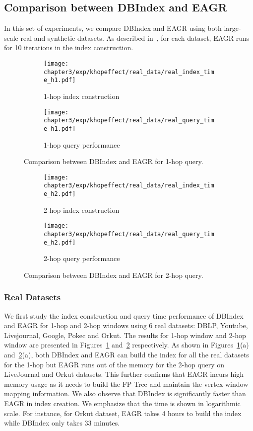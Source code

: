 \subsection{Comparison between DBIndex and EAGR}

In this set of experiments, we compare DBIndex and 
EAGR \cite{mondal2014eagr} using both large-scale real 
and synthetic datasets. As described in~\cite{mondal2014eagr},
for each dataset, EAGR runs for 10 
iterations in the index construction.

\begin{figure}[h]
\centering
\begin{subfigure}{0.45\linewidth}
  \centering
  \texttt{[image: chapter3/exp/khopeffect/real\_data/real\_index\_time\_h1.pdf]}
  \caption{1-hop index construction}
\end{subfigure} \begin{subfigure}{0.45\linewidth}
  \centering
  \texttt{[image: chapter3/exp/khopeffect/real\_data/real\_query\_time\_h1.pdf]}
  \caption{1-hop query performance}
\end{subfigure}%
\caption{Comparison between DBIndex and EAGR  for 1-hop query.}
\label{fig:1-hop-real}
\end{figure}

\begin{figure}[h]
\centering
\begin{subfigure}{0.45\linewidth}
  \centering
  \texttt{[image: chapter3/exp/khopeffect/real\_data/real\_index\_time\_h2.pdf]}
  \caption{2-hop index construction}
\end{subfigure}
\begin{subfigure}{0.45\linewidth}
  \centering
  \texttt{[image: chapter3/exp/khopeffect/real\_data/real\_query\_time\_h2.pdf]}
  \caption{2-hop query performance}
\end{subfigure}
\caption{Comparison between DBIndex and EAGR for 2-hop query.}
\label{fig:2-hop-real}
\end{figure}

\subsubsection{Real Datasets} 
We first study the index construction and 
query time performance of DBIndex and EAGR for 1-hop and 2-hop windows 
using 6 real datasets: DBLP, Youtube, Livejournal, Google, Pokec and Orkut. 
The results for 1-hop window and 2-hop window are presented
in Figures~\ref{fig:1-hop-real} and~\ref{fig:2-hop-real} 
respectively. 
As shown in Figures~\ref{fig:1-hop-real}(a) and~\ref{fig:2-hop-real}(a), both DBIndex and EAGR can build the index for all
the real datasets for the 1-hop but EAGR runs out of the memory for the 2-hop query on LiveJournal and Orkut datasets. This further confirms that EAGR incurs 
high memory usage as it needs to build the FP-Tree and 
maintain the vertex-window mapping information. We also observe that 
DBIndex is significantly faster than EAGR in index creation. 
We emphasize that the time is shown in logarithmic scale. 
For instance, for Orkut dataset, EAGR takes 4 hours to build the index 
while DBIndex only takes 33 minutes. 

